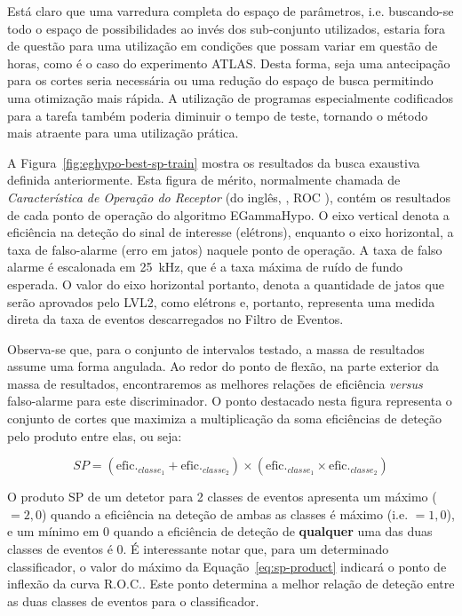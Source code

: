 Está claro que uma varredura completa do espaço de parâmetros,
i.e. buscando-se todo o espaço de possibilidades ao invés dos sub-conjunto
utilizados, estaria fora de questão para uma utilização em condições que
possam variar em questão de horas, como é o caso do experimento ATLAS. Desta
forma, seja uma antecipação para os cortes seria necessária ou uma redução do
espaço de busca permitindo uma otimização mais rápida. A utilização de
programas especialmente codificados para a tarefa também poderia diminuir o
tempo de teste, tornando o método mais atraente para uma utilização prática.

A Figura~\ref{fig:eghypo-best-sp-train} mostra os resultados da busca
exaustiva definida anteriormente. Esta figura de mérito, normalmente chamada
de \textit{Característica de Operação do Receptor} (do inglês,
, ROC \cite{vantrees}), contém os
resultados de cada ponto de operação do algoritmo EGammaHypo. O eixo vertical
denota a eficiência na deteção do sinal de interesse (elétrons), enquanto o
eixo horizontal, a taxa de falso-alarme (erro em jatos) naquele ponto de
operação. A taxa de falso alarme é escalonada em 25~kHz, que é a taxa máxima
de ruído de fundo esperada. O valor do eixo horizontal portanto, denota a
quantidade de jatos que serão aprovados pelo LVL2, como elétrons e, portanto,
representa uma medida direta da taxa de eventos descarregados no Filtro de
Eventos.

Observa-se que, para o conjunto de intervalos testado, a massa de resultados
assume uma forma angulada. Ao redor do ponto de flexão, na parte exterior da
massa de resultados, encontraremos as melhores relações de eficiência
\textit{versus} falso-alarme para este discriminador. O ponto destacado nesta
figura representa o conjunto de cortes que maximiza a multiplicação da soma
eficiências de deteção pelo produto entre elas, ou seja:

\begin{equation}
SP = (\text{efic.}_{classe_1} + \text{efic.}_{classe_2}) \times
(\text{efic.}_{classe_1} \times \text{efic.}_{classe_2})
\label{eq:sp-product}
\end{equation}

O produto SP de um detetor para 2 classes de eventos apresenta um máximo
($=2,0$) quando a eficiência na deteção de ambas as classes é máximo
(i.e. $=1,0$), e um mínimo em $0$ quando a eficiência de deteção de
\textbf{qualquer} uma das duas classes de eventos é $0$. É interessante notar
que, para um determinado classificador, o valor do máximo da
Equação~\ref{eq:sp-product} indicará o ponto de inflexão da curva R.O.C.. Este
ponto determina a melhor relação de deteção entre as duas classes de eventos
para o classificador.

